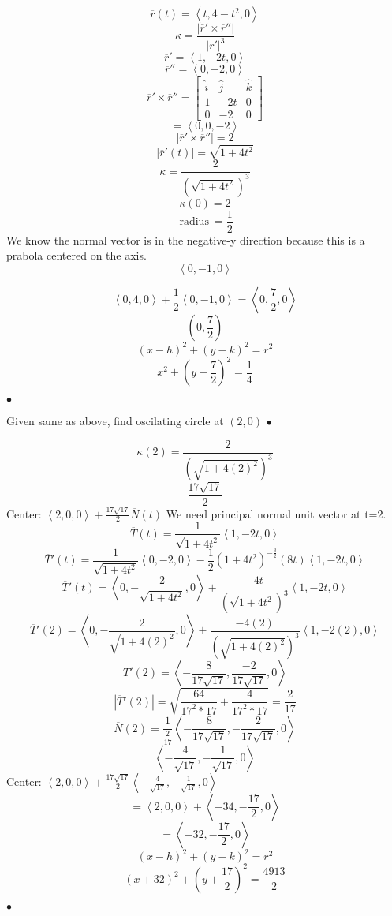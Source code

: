 \begin{solution}
	\[\overline{r}(t) = \left<t, 4-t^2, 0 \right>\]
	\[\kappa = \frac{\left| \overline{r}' \times  \overline{r}'' \right| }{\left| \overline{r}' \right|^3 }\]
	\[\overline{r}' = \left< 1, -2t, 0 \right>\]
	\[\overline{r}'' = \left< 0, -2, 0 \right>\]
	\[\overline{r}' \times  \overline{r}'' = \begin{bmatrix} \hat{i} & \hat{j} & \hat{k} \\ 1 & -2t & 0 \\ 0 & -2 & 0\end{bmatrix} \]
	\[= \left<0, 0, -2 \right>\]
	\[\left| \overline{r}' \times \overline{r}'' \right| = 2\]
	\[\left| \overline{r}'(t) \right| = \sqrt{1+4t^2} \]
	\[\kappa = \frac{2}{(\sqrt{1+4t^2} )^3}\]
	\[\kappa(0) = 2\]
	\[\:\text{radius}\:= \frac{1}{2}\]
	We know the normal vector is in the negative-y direction because this is a prabola centered on the axis.
	\[\left<0, -1, 0 \right>\]

	\[\left<0,4,0 \right> + \frac{1}{2}\left<0, -1, 0 \right> = \left<0, \frac{7}{2}, 0 \right>\]
	\[(0,\frac{7}{2})\]
	\[(x-h)^2 + (y-k)^2 = r^2\]
	\[\boxed{x^2 + (y-\frac{7}{2})^2 = \frac{1}{4}}\]

\smallskip\hfill$\bullet$\end{solution}

\begin{example}
	Given same as above, find oscilating circle at $(2, 0)$
\smallskip\hfill$\bullet$\end{example}
\begin{solution}
	\[\kappa(2) = \frac{2}{(\sqrt{1+4(2)^2} )^3}\]
	\[\frac{17\sqrt{17} }{2}\]
	Center: $\left<2, 0, 0 \right> + \frac{17\sqrt{17} }{2}\overline{N}(t)$
	We need principal normal unit vector at t=2.
	\[\overline{T}(t) = \frac{1}{\sqrt{1+4t^2} }\left<1, -2t, 0 \right>\]
	\[\overline{T}'(t) = \frac{1}{\sqrt{1+4t^2} }\left< 0, -2, 0 \right> - \frac{1}{2} ({1+4t^2})^{-\frac{3}{2}}(8t)\left< 1, -2t, 0 \right>\]
	\[\overline{T}'(t) = \left<0,-\frac{2}{\sqrt{1+4t^2} }, 0 \right> + \frac{-4t}{\left( \sqrt{1+4t^2}  \right)^{3} }\left<1, -2t, 0 \right>\]
	\[\overline{T}'(2) = \left<0,-\frac{2}{\sqrt{1+4(2)^2} }, 0 \right> + \frac{-4(2)}{\left( \sqrt{1+4(2)^2}  \right)^{3} }\left<1, -2(2), 0 \right>\]
	\[\overline{T}'(2) = \left<-\frac{8}{17\sqrt{17} }, \frac{-2}{17\sqrt{17} }, 0 \right>\]
	\[\left| \overline{T}'(2) \right| = \sqrt{\frac{64}{17^2*17} + \frac{4}{17^2*17}} = \frac{2}{17}\]
	\[\overline{N}(2) = \frac{1}{\frac{2}{17}} \left<-\frac{8}{17\sqrt{17} }, -\frac{2}{17\sqrt{17} }, 0 \right>\]
	\[\left<-\frac{4}{\sqrt{17} }, -\frac{1}{\sqrt{17} }, 0 \right>\]
	Center: $\left<2,0,0 \right> + \frac{17\sqrt{17} }{2} \left<-\frac{4}{\sqrt{17} }, -\frac{1}{\sqrt{17} }, 0 \right>$
	\[=\left<2, 0, 0 \right>+ \left<-34, -\frac{17}{2}, 0 \right>\]
	\[=\left<-32, -\frac{17}{2}, 0 \right>\]
	\[(x-h)^2 + (y-k)^2 = r^2\]
	\[\boxed{(x+32)^2 + (y +\frac{17}{2})^2 = \frac{4913}{2}}\]

\smallskip\hfill$\bullet$\end{solution}




\newpage


